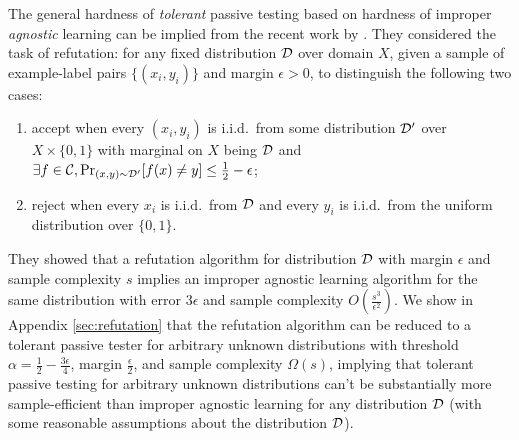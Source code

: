 The general hardness of \emph{tolerant} passive testing based on hardness of improper \emph{agnostic} learning can be implied from the recent work by \citet{KL18}. They considered the task of refutation: for any fixed distribution ${\mathcal{D}}$ over domain $X$, given a sample of example-label pairs $\{(x_i,y_i)\}$ and margin $\epsilon>0$, to distinguish the following two cases:
\begin{enumerate}
\item accept when every $(x_i,y_i)$ is i.i.d.\ from some distribution ${\mathcal{D}}'$ over $X\times\{0,1\}$ with marginal on $X$ being ${\mathcal{D}}$ and $\exists f\in{\mathcal{C}},\Pr_{(x,y)\sim{\mathcal{D}}'}[f(x)\neq y]\leq\frac 12-\epsilon$;
\item reject when every $x_i$ is i.i.d.\ from ${\mathcal{D}}$ and every $y_i$ is i.i.d.\ from the uniform distribution over $\{0,1\}$.
\end{enumerate}
They showed that a refutation algorithm for distribution ${\mathcal{D}}$ with margin $\epsilon$ and sample complexity $s$ implies an improper agnostic learning algorithm for the same distribution with error $3\epsilon$ and sample complexity $O(\frac{s^3}{\epsilon^2})$. We show in Appendix \ref{sec:refutation} that the refutation algorithm can be reduced to a tolerant passive tester for arbitrary unknown distributions with threshold $\alpha=\frac 12-\frac{3\epsilon}4$, margin $\frac{\epsilon}{2}$, and sample complexity $\Omega(s)$, implying that tolerant passive testing for arbitrary unknown distributions can't be substantially more sample-efficient than improper agnostic learning for any distribution ${\mathcal{D}}$ (with some reasonable assumptions about the distribution ${\mathcal{D}}$). %


